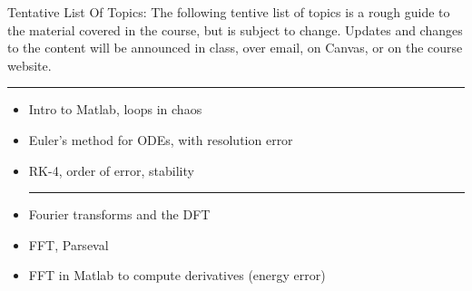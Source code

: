 \documentclass[margin]{res}
\theoremstyle{plain}
\theoremstyle{definition}
\theoremstyle{remark}
\begin{document}
\begin{resume}

\newpage 


Tentative List Of Topics: The following tentive list of topics is a rough guide to the material covered in the course, but is subject to change. Updates and changes to the content will be announced in class, over email, on Canvas, or on the course website.\\

\hrule

\vspace{-0.5cm}

{\small
\begin{itemize}
\item Intro to Matlab, loops in chaos
\item Euler's method for ODEs, with resolution error
\item RK-4, order of error, stability

\hrule
\item Fourier transforms and the DFT
\item FFT, Parseval
\item FFT in Matlab to compute derivatives (energy error)


\end{itemize}}
\end{resume}
\end{document}
